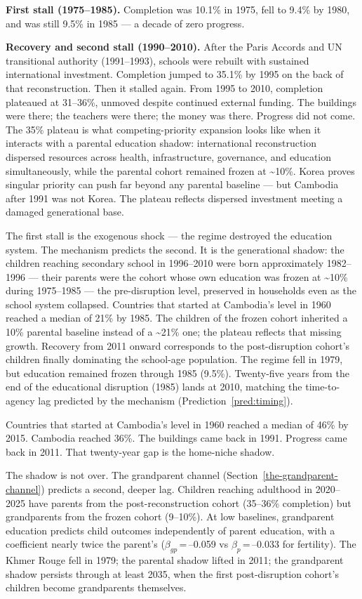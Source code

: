 \documentclass[12pt,letterpaper]{article}
\begin{document}
\textbf{First stall (1975--1985).} Completion was 10.1\% in 1975, fell to 9.4\% by 1980, and was still 9.5\% in 1985 --- a decade of zero progress.

\textbf{Recovery and second stall (1990--2010).} After the Paris Accords
and UN transitional authority (1991--1993), schools were rebuilt with
sustained international investment. Completion jumped to 35.1\% by 1995
on the back of that reconstruction. Then it stalled again. From 1995 to
2010, completion plateaued at 31--36\%, unmoved despite continued
external funding. The buildings were there; the teachers were there; the
money was there. Progress did not come. The 35\% plateau is what
competing-priority expansion looks like when it interacts with a
parental education shadow: international reconstruction dispersed
resources across health, infrastructure, governance, and education
simultaneously, while the parental cohort remained frozen at
\textasciitilde10\%. Korea proves singular priority can push far beyond
any parental baseline --- but Cambodia after 1991 was not Korea. The
plateau reflects dispersed investment meeting a damaged generational
base.

The first stall is the exogenous shock --- the regime destroyed the
education system. The mechanism predicts the second. It is the
generational shadow:
the children reaching secondary school in 1996--2010 were born
approximately 1982--1996 --- their parents were the cohort whose own
education was frozen at \textasciitilde10\% during 1975--1985 --- the
pre-disruption level, preserved in households even as the school system
collapsed. Countries that started at Cambodia's level in 1960 reached a
median of 21\% by 1985. The children of the frozen cohort inherited a
10\% parental baseline instead of a \textasciitilde21\% one; the plateau
reflects that missing growth. Recovery
from 2011 onward corresponds to the post-disruption cohort's children
finally dominating the school-age population. The regime fell in 1979,
but education remained frozen through 1985 (9.5\%). Twenty-five years
from the end of the educational disruption (1985) lands at 2010, matching the time-to-agency lag predicted by the mechanism (Prediction~\ref{pred:timing}).

Countries that started at Cambodia's level in 1960 reached a median of
46\% by 2015. Cambodia reached 36\%. The buildings came back in 1991.
Progress came back in 2011. That twenty-year gap is the home-niche shadow.

The shadow is not over. The grandparent channel
(Section~\ref{the-grandparent-channel}) predicts a second, deeper lag.
Children reaching adulthood in 2020--2025 have parents from the
post-reconstruction cohort (35--36\% completion) but grandparents from
the frozen cohort (9--10\%). At low baselines, grandparent education
predicts child outcomes independently of parent education, with a
coefficient nearly twice the parent's
($\beta_{gp}$\,=\,--0.059 vs $\beta_p$\,=\,--0.033 for fertility).
The Khmer Rouge fell in 1979; the parental shadow lifted in 2011;
the grandparent shadow persists through at least 2035, when the first
post-disruption cohort's children become grandparents themselves.
\end{document}
